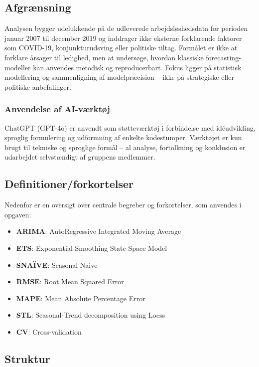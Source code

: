\documentclass[
]{article}
\providecommand{\tightlist}{%
  \setlength{\itemsep}{0pt}\setlength{\parskip}{0pt}}\usepackage{longtable,booktabs,array}
\begin{document}
\subsection{Afgrænsning}\label{afgruxe6nsning}

Analysen bygger udelukkende på de udleverede arbejdsløshedsdata for
perioden januar 2007 til december 2019 og inddrager ikke eksterne
forklarende faktorer som COVID-19, konjunkturudsving eller politiske
tiltag. Formålet er ikke at forklare årsager til ledighed, men at
undersøge, hvordan klassiske forecasting-modeller kan anvendes metodisk
og reproducerbart. Fokus ligger på statistisk modellering og
sammenligning af modelpræcision -- ikke på strategiske eller politiske
anbefalinger.

\subsubsection{Anvendelse af
AI-værktøj}\label{anvendelse-af-ai-vuxe6rktuxf8j}

ChatGPT (GPT-4o) er anvendt som støtteværktøj i forbindelse med
idéudvikling, sproglig formulering og udformning af enkelte kodestumper.
Værktøjet er kun brugt til tekniske og sproglige formål -- al analyse,
fortolkning og konklusion er udarbejdet selvstændigt af gruppens
medlemmer.

\subsection{Definitioner/forkortelser}\label{definitionerforkortelser}

Nedenfor er en oversigt over centrale begreber og forkortelser, som
anvendes i opgaven:

\begin{itemize}
\tightlist
\item
  \textbf{ARIMA}: AutoRegressive Integrated Moving Average
\item
  \textbf{ETS}: Exponential Smoothing State Space Model
\item
  \textbf{SNAÏVE}: Seasonal Naive
\item
  \textbf{RMSE}: Root Mean Squared Error
\item
  \textbf{MAPE}: Mean Absolute Percentage Error
\item
  \textbf{STL}: Seasonal-Trend decomposition using Loess
\item
  \textbf{CV}: Cross-validation
\end{itemize}

\subsection{Struktur}\label{struktur}
\end{document}
